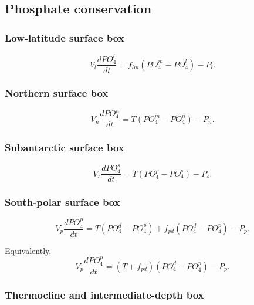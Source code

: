 \documentclass[11pt]{article}
\begin{document}
\subsection{Phosphate conservation}

\subsubsection{Low-latitude surface box}

\begin{equation}
V_l\frac{dPO_4^l}{dt}
=
f_{lm}\left(PO_4^m-PO_4^l\right)
-
P_l.
\label{eq:six_po4_l}
\end{equation}

\subsubsection{Northern surface box}

\begin{equation}
V_n\frac{dPO_4^n}{dt}
=
T\left(PO_4^m-PO_4^n\right)
-
P_n.
\label{eq:six_po4_n}
\end{equation}

\subsubsection{Subantarctic surface box}

\begin{equation}
V_s\frac{dPO_4^s}{dt}
=
T\left(PO_4^p-PO_4^s\right)
-
P_s.
\label{eq:six_po4_s}
\end{equation}

\subsubsection{South-polar surface box}

\begin{equation}
V_p\frac{dPO_4^p}{dt}
=
T\left(PO_4^d-PO_4^p\right)
+
f_{pd}\left(PO_4^d-PO_4^p\right)
-
P_p.
\label{eq:six_po4_p}
\end{equation}

Equivalently,
\begin{equation}
V_p\frac{dPO_4^p}{dt}
=
\left(T+f_{pd}\right)
\left(PO_4^d-PO_4^p\right)
-
P_p.
\label{eq:six_po4_p_compact}
\end{equation}

\subsubsection{Thermocline and intermediate-depth box}
\end{document}
